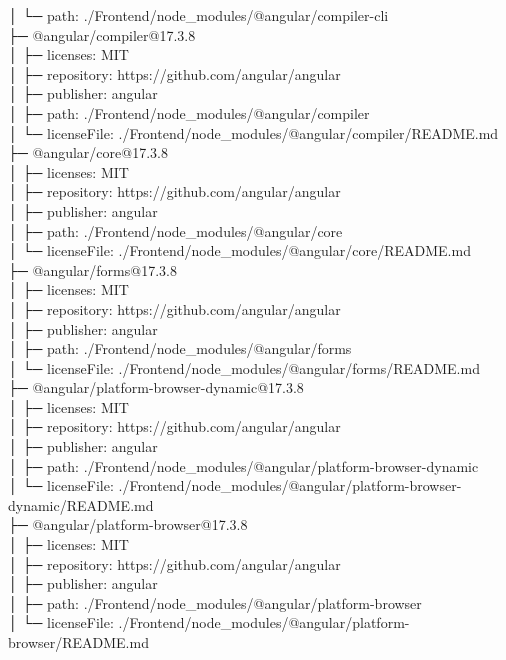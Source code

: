 │  └─ path: ./Frontend/node\_modules/@angular/compiler-cli\\
├─ @angular/compiler@17.3.8\\
│  ├─ licenses: MIT\\
│  ├─ repository: https://github.com/angular/angular\\
│  ├─ publisher: angular\\
│  ├─ path: ./Frontend/node\_modules/@angular/compiler\\
│  └─ licenseFile: ./Frontend/node\_modules/@angular/compiler/README.md\\
├─ @angular/core@17.3.8\\
│  ├─ licenses: MIT\\
│  ├─ repository: https://github.com/angular/angular\\
│  ├─ publisher: angular\\
│  ├─ path: ./Frontend/node\_modules/@angular/core\\
│  └─ licenseFile: ./Frontend/node\_modules/@angular/core/README.md\\
├─ @angular/forms@17.3.8\\
│  ├─ licenses: MIT\\
│  ├─ repository: https://github.com/angular/angular\\
│  ├─ publisher: angular\\
│  ├─ path: ./Frontend/node\_modules/@angular/forms\\
│  └─ licenseFile: ./Frontend/node\_modules/@angular/forms/README.md\\
├─ @angular/platform-browser-dynamic@17.3.8\\
│  ├─ licenses: MIT\\
│  ├─ repository: https://github.com/angular/angular\\
│  ├─ publisher: angular\\
│  ├─ path: ./Frontend/node\_modules/@angular/platform-browser-dynamic\\
│  └─ licenseFile: ./Frontend/node\_modules/@angular/platform-browser-dynamic/README.md\\
├─ @angular/platform-browser@17.3.8\\
│  ├─ licenses: MIT\\
│  ├─ repository: https://github.com/angular/angular\\
│  ├─ publisher: angular\\
│  ├─ path: ./Frontend/node\_modules/@angular/platform-browser\\
│  └─ licenseFile: ./Frontend/node\_modules/@angular/platform-browser/README.md\\
